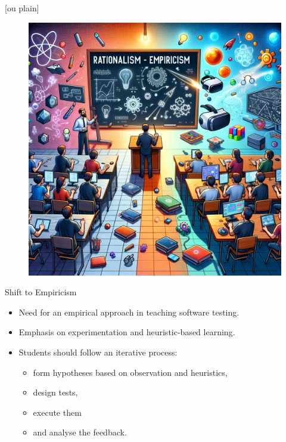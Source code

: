 \documentclass[aspectratio=169]{beamer}
\begin{document}
[ou plain]
\begin{frame}
\begin{figure}
    \centering
    \vspace{-1cm}
    \hspace*{-1.2cm}\includegraphics[width=1.2\linewidth]{images/plaatje.png}
\end{figure}
\end{frame}

\begin{frame}{Shift to Empiricism}
    \begin{itemize}
        \item Need for an empirical approach in teaching software testing.
        \item Emphasis on experimentation and heuristic-based learning.
        \item Students should follow an iterative process:
        \begin{itemize}
            \item form hypotheses based on observation and heuristics, 
            \item design tests, 
            \item execute them 
            \item and analyse the feedback.
        \end{itemize}
    \end{itemize}
\end{frame}
\end{document}
